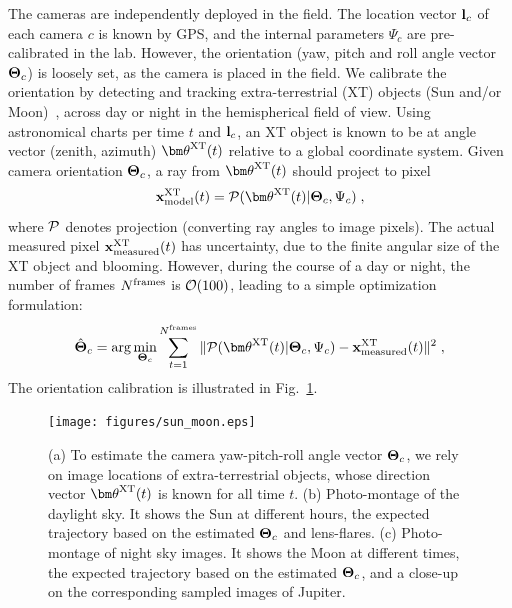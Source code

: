 \documentclass[runningheads]{llncs}
\begin{document}
The cameras are independently deployed in the field. The location vector ${\bf l}_c$ 
of each camera $c$ is known by GPS, and the internal parameters $\Psi_c$ are pre-calibrated in the lab. However, the orientation (yaw, pitch and roll angle vector ${\bf \Theta}_c$) is loosely set, as the camera is placed in the field. We calibrate the orientation by detecting and tracking extra-terrestrial (XT) objects (Sun and/or Moon)~\cite{Seiz2002,lalonde}, across day or night in the hemispherical field of view. Using astronomical charts per time $t$ and ${\bf l}_c$, an XT object is known to be at angle vector (zenith, azimuth) ${\bm \theta}^{\rm XT}(t)$ relative to a global coordinate system. Given camera orientation ${\bf \Theta}_c$, a ray from ${\bm \theta}^{\rm XT}(t)$ should project to pixel
\begin{equation}
{\bf x}^{\rm XT}_{\rm model}(t) = {\cal P}({\bm \theta}^{\rm XT}(t)|{\bf \Theta}_c,\Psi_c)
\;,
 \label{eq:xt}
\end{equation}
where ${\cal P}$ denotes projection (converting ray angles to image pixels).
The actual measured pixel ${\bf x}^{\rm XT}_{\rm measured}(t)$ has uncertainty, due to the finite angular size of the XT object and blooming. However, during the course of a day or night, the number of frames
  $N^{\rm frames}$ is ${\cal O}(100)$, leading to a simple optimization formulation:
\begin{equation}
 \hat{\bf \Theta}_c=\arg\min_{{\bf \Theta}_c}
 \sum_{t=1}^{N^{\rm frames}}
 \|{\cal P}({\bm \theta}^{\rm XT}(t)|{\bf \Theta}_c,\Psi_c) - {\bf x}^{\rm XT}_{\rm measured}(t)\|^2
\;,
 \label{eq:hatThetac}
\end{equation}
The orientation calibration is illustrated in Fig.~\ref{fig:sunmotion}.
\begin{figure}[t!]
\begin{center}
   \texttt{[image: figures/sun\_moon.eps]}
\end{center}
   \vspace{-0.6cm}
   \caption{(a) To estimate the camera yaw-pitch-roll angle vector ${\bf \Theta}_c$, we rely on
   image locations of extra-terrestrial objects, whose direction vector ${\bm \theta}^{\rm XT}(t)$
   is known for all time $t$. (b) Photo-montage of the daylight sky. It shows the Sun at different hours, the expected trajectory based on the estimated ${\bf \Theta}_c$ and lens-flares. (c)
   Photo-montage of night sky images. It shows the Moon at different times, the expected trajectory based on the estimated ${\bf \Theta}_c$, and a close-up on the corresponding sampled images of Jupiter.}
\label{fig:sunmotion}
\end{figure}
\end{document}
